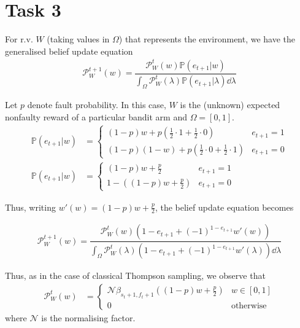 \section*{Task 3}
For r.v. $W$ (taking values in $\Omega$) that represents the environment, we have the generalised belief update equation
\begin{align*}
    \mathcal{P}_W^{t + 1}(w) = \dfrac{\mathcal{P}_W^{t}(w)\mathbb{P}(e_{t+1} | w)}{\int_\Omega\mathcal{P}_W^{t}(\lambda)\mathbb{P}(e_{t+1} | \lambda)\dd\lambda}
\end{align*}

Let $p$ denote fault probability. In this case, $W$ is the (unknown) expected nonfaulty reward of a particular bandit arm and $\Omega=[0,1]$.
\begin{align*}
    \mathbb{P}(e_{t + 1} | w) &= \begin{cases}
        (1-p)w + p\left(\tfrac{1}{2}\cdot 1 + \tfrac{1}{2}\cdot 0\right) & e_{t+1} = 1 \\
        (1-p)(1 - w) + p\left(\tfrac{1}{2}\cdot 0 + \tfrac{1}{2}\cdot 1\right) & e_{t+1} = 0
    \end{cases} \\
    \mathbb{P}(e_{t + 1} | w) &= \begin{cases}
        (1-p)w + \tfrac{p}{2} & e_{t+1} = 1 \\
        1 - \left((1-p)w + \tfrac{p}{2}\right) & e_{t+1} = 0
    \end{cases}
\end{align*}

Thus, writing $w'(w) = (1-p)w + \tfrac{p}{2}$, the belief update equation becomes

\begin{align*}
    \mathcal{P}_W^{t + 1}(w) = \dfrac{\mathcal{P}_W^t(w)(1 - e_{t+1} + (-1)^{1 - e_{t+1}}w'(w))}{\int_\Omega\mathcal{P}_W^t(\lambda)(1 - e_{t+1} + (-1)^{1 - e_{t+1}}w'(\lambda))\dd\lambda}
\end{align*}

Thus, as in the case of classical Thompson sampling, we observe that
\begin{align*}
    \mathcal{P}_W^t(w) &= \begin{cases}
        \mathcal{N}\beta_{s_t+1,f_t+1}\left((1-p)w + \tfrac{p}{2}\right) & w\in[0,1] \\
        0 & \text{otherwise}
    \end{cases}
\end{align*}
where $\mathcal{N}$ is the normalising factor.


